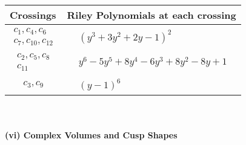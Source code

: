 \documentclass[1p]{elsarticle_modified}
\theoremstyle{definition}
\begin{document}
\begin{tabular}{m{50pt}|m{274pt}}
Crossings & \hspace{64pt}Riley Polynomials at each crossing \\
\hline $$\begin{aligned}c_{1},c_{4},c_{6}\\c_{7},c_{10},c_{12}\end{aligned}$$&$\begin{aligned}
&(y^3+3 y^2+2 y-1)^2
\end{aligned}$\\
\hline $$\begin{aligned}c_{2},c_{5},c_{8}\\c_{11}\end{aligned}$$&$\begin{aligned}
&y^6-5 y^5+8 y^4-6 y^3+8 y^2-8 y+1
\end{aligned}$\\
\hline $$\begin{aligned}c_{3},c_{9}\end{aligned}$$&$\begin{aligned}
&(y-1)^6
\end{aligned}$\\
\hline
\end{tabular}\\~\\
\newpage\flushleft \textbf{(vi) Complex Volumes and Cusp Shapes}
\end{document}
